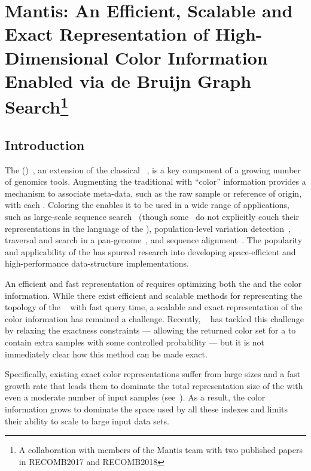 \chapter{Mantis: An Efficient, Scalable and Exact Representation of High-Dimensional Color Information Enabled via de Bruijn Graph Search\protect\footnote{A collaboration with members of the Mantis team with two published papers in RECOMB2017 and RECOMB2018}}
\label{chap:mantis}


\section{Introduction}\label{sec:intro}

The \longcdbg (\cdbg)~\cite{IqbalCaTu12}, an extension of the classical
\dbg~\citep{pevzner2001eulerian,pevzner2001fragment,chikhi2014representation},
is a key component of a growing number of genomics tools. Augmenting the traditional
\dbg with ``color'' information provides a mechanism to associate meta-data,
such as the raw sample or reference of origin, with each \kmer. Coloring the \dbg
enables it to be used in a wide range of applications, such as large-scale sequence
search~\citep{mantis, Solomon2016Fast, Solomon2017Improved,
Sun2017Allsome, bradley2017real} (though some~\citep{Solomon2016Fast, Solomon2017Improved,Sun2017Allsome}
do not explicitly couch their representations in
the language of the \cdbg), population-level variation
detection~\cite{MuggliBoNo17, holley2016bloom, rainbowfish}, traversal and search
in a pan-genome~\cite{holley2016bloom}, and sequence
alignment~\cite{liu2016debga}. The popularity and applicability of the
\cdbg has spurred research into developing space-efficient and high-performance
data-structure implementations.

An efficient and fast representation of \cdbg requires optimizing both the \dbg and the
color information.  While there exist efficient and scalable methods
for representing the topology of the
\dbg~\cite{chikhi2012space,salikhov2014using,bowe2012succinct,chikhi2014representation,crawford2018practical,PandeyBeJo2017d}
with fast query time, a scalable and exact representation of the color
information has remained a challenge. Recently, ~\citet{doi:10.1093/bioinformatics/bty632}
has tackled this challenge by relaxing the exactness
constraints --- allowing the returned color set for a \kmer to contain extra
samples with some controlled probability --- but it is not immediately clear how
this method can be made exact.

Specifically,  existing exact color representations suffer from large
sizes and a fast growth rate that leads them to dominate the total
representation size of the \cdbg with even a moderate number of input
samples (see~).  As a result, the color information grows to
dominate the space used by all these indexes and limits their ability to scale
to large input data sets.

